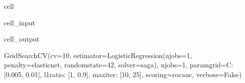 \documentclass[letterpaper,10pt,english]{jupyterBook}
\begin{document}
\begin{sphinxuseclass}{cell}
\begin{sphinxVerbatimInput}
\begin{sphinxuseclass}{cell_input}
\end{sphinxuseclass}\end{sphinxVerbatimInput}
\begin{sphinxVerbatimOutput}

\begin{sphinxuseclass}{cell_output}
\begin{sphinxVerbatim}[commandchars=\\\{\}]
GridSearchCV(cv=10,
             estimator=LogisticRegression(n\PYGZus{}jobs=\PYGZhy{}1, penalty=\PYGZsq{}elasticnet\PYGZsq{},
                                          random\PYGZus{}state=42, solver=\PYGZsq{}saga\PYGZsq{}),
             n\PYGZus{}jobs=\PYGZhy{}1,
             param\PYGZus{}grid=\PYGZob{}\PYGZsq{}C\PYGZsq{}: [0.005, 0.01], \PYGZsq{}l1\PYGZus{}ratio\PYGZsq{}: [1, 0.9],
                         \PYGZsq{}max\PYGZus{}iter\PYGZsq{}: [10, 25]\PYGZcb{},
             scoring=\PYGZsq{}roc\PYGZus{}auc\PYGZsq{}, verbose=False)
\end{sphinxVerbatim}

\end{sphinxuseclass}\end{sphinxVerbatimOutput}

\end{sphinxuseclass}
\end{document}
